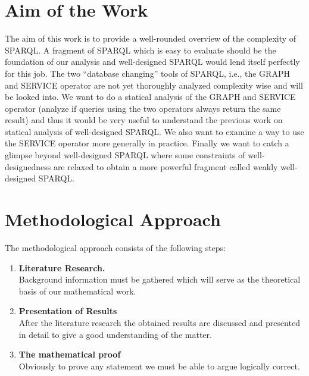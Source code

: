 
\section{Aim of the Work}
The aim of this work is to provide a well-rounded overview of the complexity of
SPARQL. A fragment of SPARQL which is easy to evaluate should be the foundation
of our analysis and well-designed SPARQL 
would lend itself perfectly for this job. The two ``database changing'' tools of SPARQL, i.e., the GRAPH and
SERVICE operator are not yet thoroughly analyzed complexity wise and will be looked into. 
We want to do a statical analysis of the GRAPH and SERVICE operator (analyze if queries using the two
operators always return the same result) and thus it would be very useful to understand
the previous work on statical analysis of well-designed SPARQL. We also want to
examine a way to use the SERVICE operator more generally in practice. Finally we
want to catch a glimpse beyond well-designed SPARQL where some constraints of
well-designedness are relaxed to obtain a more powerful fragment called  weakly well-designed SPARQL.

\section{Methodological Approach}
The methodological approach consists of the following steps:
\begin{enumerate}
	\item \textbf{Literature Research.}\\
		Background information must be gathered which will serve as the
		theoretical basis of our mathematical work.
	\item \textbf{Presentation of Results}\\
		After the literature research the obtained results are discussed and
		presented in detail to give a good understanding of the matter.
	\item \textbf{The mathematical proof}\\
		Obviously to prove any statement we must be able to argue
		logically correct. 
\end{enumerate}
